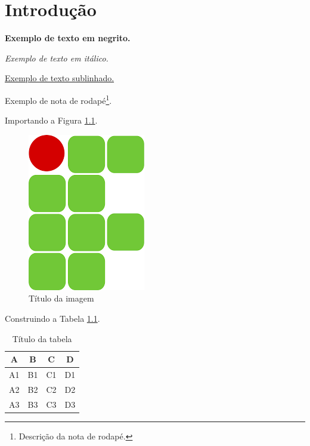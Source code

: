 \documentclass[
    12pt,               %
    openright,          %
    oneside,            %
    a4paper,            %
    english,            %
    french,             %
    spanish,            %
    brazil              %
    ]{abntex2}
\begin{document}
\chapter[Introdução]{Introdução}

\textbf{Exemplo de texto em negrito.}

\textit{Exemplo de texto em itálico.}

\underline{Exemplo de texto sublinhado.}

Exemplo de nota de rodapé\footnote{Descri\c cão da nota de rodapé.}.

Importando a Figura \ref{fig:imagem}.

\begin{figure}[htb]
   \centering
   \caption{Título da imagem}
   \label{fig:imagem}
   \includegraphics[scale=0.5]{imagens/if}
\end{figure}

Construindo a Tabela \ref{tab:tabela}.

\begin{table}[htb]
\center
\footnotesize
\caption{Título da tabela}
\label{tab:tabela}
\begin{tabular} {|c|c|c|c|} %
  \hline
   \textbf{A} & \textbf{B}  & \textbf{C}  & \textbf{D}  \\
    \hline \hline
    	A1 & B1 & C1& D1\\
   \hline
       	A2 & B2 & C2 & D2\\
   \hline
    	A3 & B3 & C3 & D3\\
   \hline
\end{tabular}
\end{table}
\end{document}
